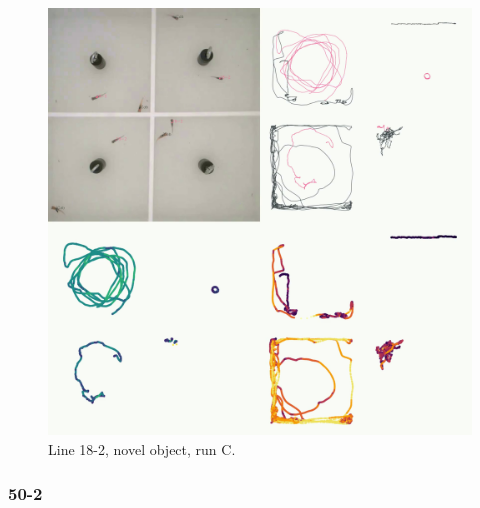 \documentclass[
]{book}
\begin{document}
\begin{figure}
\includegraphics[width=1\linewidth]{figs/mikk_behaviour/four_panel_plots/novel_object_20191119_1459_18-2_R_C_300} \caption{Line 18-2, novel object, run C.}\label{fig:4p-18-2-no-C}
\end{figure}

\hypertarget{section-9}{%
\subsubsection{50-2}\label{section-9}}
\end{document}
